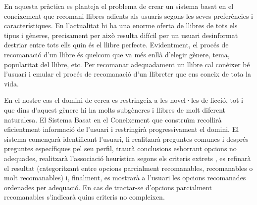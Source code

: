 
En aquesta pràctica es planteja el problema de crear un sistema basat en el coneixement que recomani llibres adients als usuaris segons les seves preferències i característiques. En l'actualitat hi ha una enorme oferta de llibres de tots els tipus i gèneres, precisament per això resulta difícil per un usuari desinformat destriar entre tots ells quin és el llibre perfecte. Evidentment, el procés de recomanació d'un llibre és quelcom que va més enllà d'elegir gènere, tema, popularitat del llibre, etc. Per recomanar adequadament un llibre cal conèixer bé l'usuari i emular el procés de recomanació d'un llibreter que ens coneix de tota la vida.

En el nostre cas el domini de cerca es restringeix a les novel·les de ficció, tot i que dins d'aquest gènere hi ha molts subgèneres i llibres de molt diferent naturalesa. El Sistema Basat en el Coneixement que construïm recollirà eficientment informació de l'usuari i restringirà progressivament el domini. El sistema començarà identificant l'usuari, li realitzarà preguntes comunes i després preguntes específiques pel seu perfil, traurà conclusions esborrant opcions no adequades, realitzarà l'associació heurística segons els criteris extrets , es refinarà el resultat (categoritzant entre opcions parcialment recomanables, recomanables o molt recomanables) i, finalment, es mostrarà a l'usuari les opcions recomanades ordenades per adequació. En cas de tractar-se d'opcions parcialment recomanables s'indicarà quins criteris no compleixen.

